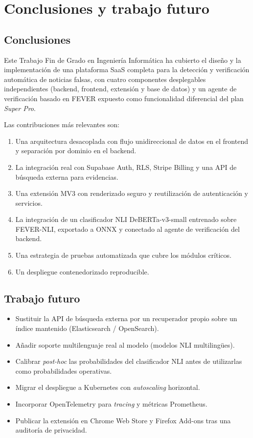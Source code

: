 \chapter{Conclusiones y trabajo futuro}\label{cap:conclusiones}

\section{Conclusiones}

Este Trabajo Fin de Grado en Ingeniería Informática ha cubierto el
diseño y la implementación de una plataforma SaaS completa para la
detección y verificación automática de noticias falsas, con cuatro
componentes desplegables independientes (backend, frontend, extensión
y base de datos) y un agente de verificación basado en FEVER expuesto
como funcionalidad diferencial del plan \emph{Super Pro}.

Las contribuciones más relevantes son:

\begin{enumerate}[leftmargin=*,itemsep=0.2em]
  \item Una arquitectura desacoplada con flujo unidireccional de
        datos en el frontend y separación por dominio en el backend.
  \item La integración real con Supabase Auth, RLS, Stripe Billing y
        una API de búsqueda externa para evidencias.
  \item Una extensión MV3 con renderizado seguro y reutilización de
        autenticación y servicios.
  \item La integración de un clasificador NLI DeBERTa-v3-small
        entrenado sobre FEVER-NLI, exportado a ONNX y conectado al
        agente de verificación del backend.
  \item Una estrategia de pruebas automatizada que cubre los módulos
        críticos.
  \item Un despliegue contenedorizado reproducible.
\end{enumerate}

\section{Trabajo futuro}

\begin{itemize}[leftmargin=*,itemsep=0.2em]
  \item Sustituir la API de búsqueda externa por un recuperador propio
        sobre un índice mantenido (Elasticsearch / OpenSearch).
  \item Añadir soporte multilenguaje real al modelo (modelos NLI
        multilingües).
  \item Calibrar \emph{post-hoc} las probabilidades del clasificador
        NLI antes de utilizarlas como probabilidades operativas.
  \item Migrar el despliegue a Kubernetes con \emph{autoscaling}
        horizontal.
  \item Incorporar OpenTelemetry para \emph{tracing} y métricas
        Prometheus.
  \item Publicar la extensión en Chrome Web Store y Firefox Add-ons
        tras una auditoría de privacidad.
\end{itemize}
